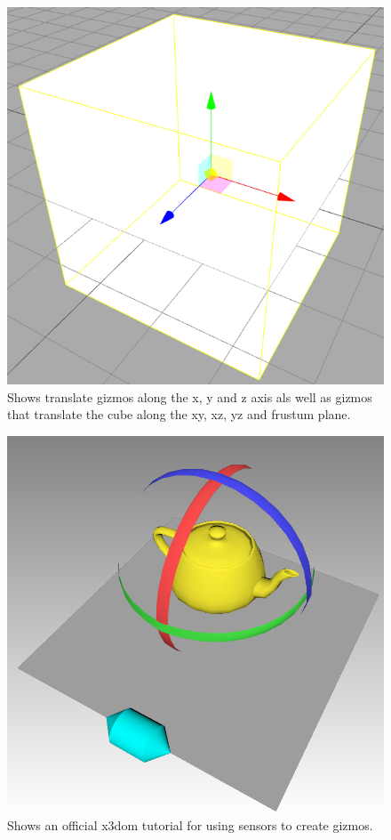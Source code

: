 \begin{figure}[]
  \centering
  \includegraphics[width=12cm]{../assets/threejs-editor.png}
	\caption{ Shows translate gizmos along the x, y and z axis als well as gizmos that translate the cube along the xy, xz, yz and frustum plane. \cite{threejseditor} }
\end{figure}
\begin{figure}[]
  \centering
  \includegraphics[width=12cm]{../assets/x3dom-gizmo-example.png}
	\caption{ Shows an official x3dom tutorial for using sensors to create gizmos. \cite{x3dgizmo} }
	\label{fig:x3dgizmo}
\end{figure}

